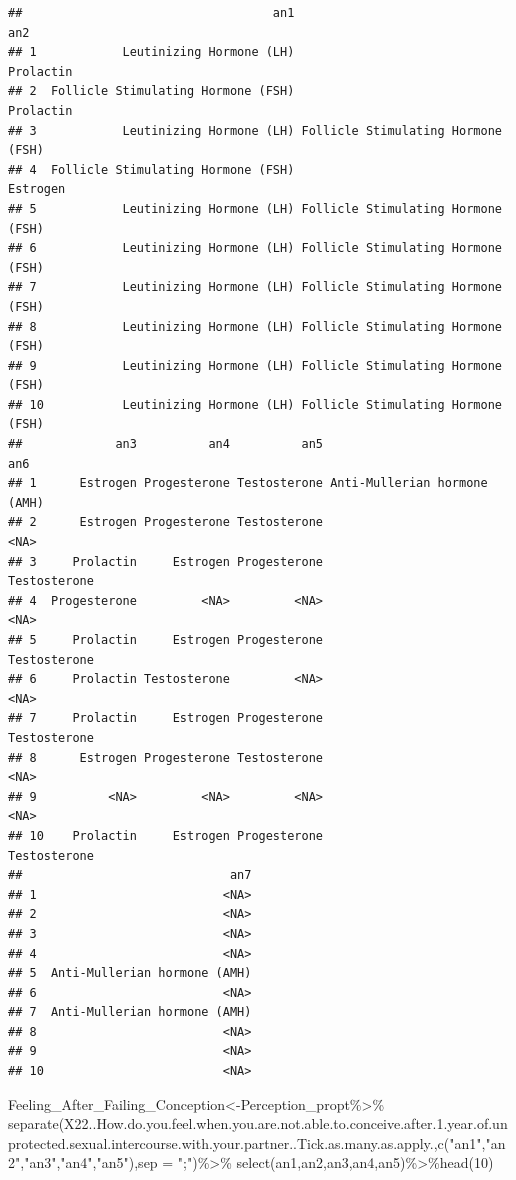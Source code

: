 \documentclass[
]{article}
\newenvironment{Shaded}{\begin{snugshade}}{\end{snugshade}}
\newcommand{\AttributeTok}[1]{\textcolor[rgb]{0.77,0.63,0.00}{#1}}
\newcommand{\DecValTok}[1]{\textcolor[rgb]{0.00,0.00,0.81}{#1}}
\newcommand{\FloatTok}[1]{\textcolor[rgb]{0.00,0.00,0.81}{#1}}
\newcommand{\FunctionTok}[1]{\textcolor[rgb]{0.00,0.00,0.00}{#1}}
\newcommand{\NormalTok}[1]{#1}
\newcommand{\OtherTok}[1]{\textcolor[rgb]{0.56,0.35,0.01}{#1}}
\newcommand{\SpecialCharTok}[1]{\textcolor[rgb]{0.00,0.00,0.00}{#1}}
\newcommand{\StringTok}[1]{\textcolor[rgb]{0.31,0.60,0.02}{#1}}
\begin{document}
\begin{verbatim}
##                                   an1                                an2
## 1            Leutinizing Hormone (LH)                          Prolactin
## 2  Follicle Stimulating Hormone (FSH)                          Prolactin
## 3            Leutinizing Hormone (LH) Follicle Stimulating Hormone (FSH)
## 4  Follicle Stimulating Hormone (FSH)                           Estrogen
## 5            Leutinizing Hormone (LH) Follicle Stimulating Hormone (FSH)
## 6            Leutinizing Hormone (LH) Follicle Stimulating Hormone (FSH)
## 7            Leutinizing Hormone (LH) Follicle Stimulating Hormone (FSH)
## 8            Leutinizing Hormone (LH) Follicle Stimulating Hormone (FSH)
## 9            Leutinizing Hormone (LH) Follicle Stimulating Hormone (FSH)
## 10           Leutinizing Hormone (LH) Follicle Stimulating Hormone (FSH)
##             an3          an4          an5                          an6
## 1      Estrogen Progesterone Testosterone Anti-Mullerian hormone (AMH)
## 2      Estrogen Progesterone Testosterone                         <NA>
## 3     Prolactin     Estrogen Progesterone                 Testosterone
## 4  Progesterone         <NA>         <NA>                         <NA>
## 5     Prolactin     Estrogen Progesterone                 Testosterone
## 6     Prolactin Testosterone         <NA>                         <NA>
## 7     Prolactin     Estrogen Progesterone                 Testosterone
## 8      Estrogen Progesterone Testosterone                         <NA>
## 9          <NA>         <NA>         <NA>                         <NA>
## 10    Prolactin     Estrogen Progesterone                 Testosterone
##                             an7
## 1                          <NA>
## 2                          <NA>
## 3                          <NA>
## 4                          <NA>
## 5  Anti-Mullerian hormone (AMH)
## 6                          <NA>
## 7  Anti-Mullerian hormone (AMH)
## 8                          <NA>
## 9                          <NA>
## 10                         <NA>
\end{verbatim}

\begin{Shaded}
\begin{Highlighting}[]
\NormalTok{Feeling\_After\_Failing\_Conception}\OtherTok{\textless{}{-}}\NormalTok{Perception\_propt}\SpecialCharTok{\%\textgreater{}\%}
  \FunctionTok{separate}\NormalTok{(X22..How.do.you.feel.when.you.are.not.able.to.conceive.after.}\FloatTok{1.}\NormalTok{year.of.unprotected.sexual.intercourse.with.your.partner..Tick.as.many.as.apply.,}\FunctionTok{c}\NormalTok{(}\StringTok{"an1"}\NormalTok{,}\StringTok{"an2"}\NormalTok{,}\StringTok{"an3"}\NormalTok{,}\StringTok{"an4"}\NormalTok{,}\StringTok{"an5"}\NormalTok{),}\AttributeTok{sep =} \StringTok{";"}\NormalTok{)}\SpecialCharTok{\%\textgreater{}\%}
  \FunctionTok{select}\NormalTok{(an1,an2,an3,an4,an5)}\SpecialCharTok{\%\textgreater{}\%}\FunctionTok{head}\NormalTok{(}\DecValTok{10}\NormalTok{)}
\end{Highlighting}
\end{Shaded}
\end{document}
